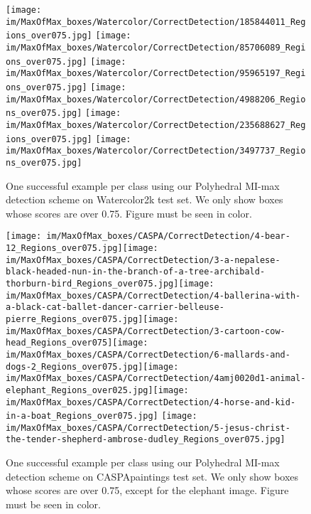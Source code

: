 \documentclass[preprint]{elsarticle}
\newcommand\MaxOfMaxS{Polyhedral MI-max}
\newcommand{\heightimageWatercolor}{2cm}
\begin{document}
\begin{figure}
\centering
  \hfill
     \texttt{[image: im/MaxOfMax\_boxes/Watercolor/CorrectDetection/185844011\_Regions\_over075.jpg]}\hfill 
     \texttt{[image: im/MaxOfMax\_boxes/Watercolor/CorrectDetection/85706089\_Regions\_over075.jpg]}\hfill
     \texttt{[image: im/MaxOfMax\_boxes/Watercolor/CorrectDetection/95965197\_Regions\_over075.jpg]}\hfill
     \texttt{[image: im/MaxOfMax\_boxes/Watercolor/CorrectDetection/4988206\_Regions\_over075.jpg]}\hfill
     \texttt{[image: im/MaxOfMax\_boxes/Watercolor/CorrectDetection/235688627\_Regions\_over075.jpg]}\hfill
     \texttt{[image: im/MaxOfMax\_boxes/Watercolor/CorrectDetection/3497737\_Regions\_over075.jpg]}\hfill
    \caption{One successful example per class using our \MaxOfMaxS{} detection scheme on Watercolor2k test set. We only show boxes whose scores are over 0.75. Figure must be seen in color.}
    \label{fig:WatercolorSuccessfulDetection}
\end{figure}

\begin{figure}
\centering
  \hfill
      \texttt{[image: im/MaxOfMax\_boxes/CASPA/CorrectDetection/4-bear-12\_Regions\_over075.jpg]}\hfill \texttt{[image: im/MaxOfMax\_boxes/CASPA/CorrectDetection/3-a-nepalese-black-headed-nun-in-the-branch-of-a-tree-archibald-thorburn-bird\_Regions\_over075.jpg]}\hfill  \texttt{[image: im/MaxOfMax\_boxes/CASPA/CorrectDetection/4-ballerina-with-a-black-cat-ballet-dancer-carrier-belleuse-pierre\_Regions\_over075.jpg]}\hfill \texttt{[image: im/MaxOfMax\_boxes/CASPA/CorrectDetection/3-cartoon-cow-head\_Regions\_over075]}\hfill \texttt{[image: im/MaxOfMax\_boxes/CASPA/CorrectDetection/6-mallards-and-dogs-2\_Regions\_over075.jpg]}\hfill \texttt{[image: im/MaxOfMax\_boxes/CASPA/CorrectDetection/4amj0020d1-animal-elephant\_Regions\_over025.jpg]}\hfill \texttt{[image: im/MaxOfMax\_boxes/CASPA/CorrectDetection/4-horse-and-kid-in-a-boat\_Regions\_over075.jpg]}\hfill
    \texttt{[image: im/MaxOfMax\_boxes/CASPA/CorrectDetection/5-jesus-christ-the-tender-shepherd-ambrose-dudley\_Regions\_over075.jpg]}\hfill
    \caption{One successful example per class using our \MaxOfMaxS{} detection scheme on CASPApaintings test set. We only show boxes whose scores are over 0.75, except for the elephant image. Figure must be seen in color.}
    \label{fig:CASPApaintingsSuccessfulDetection}
\end{figure}
\end{document}
